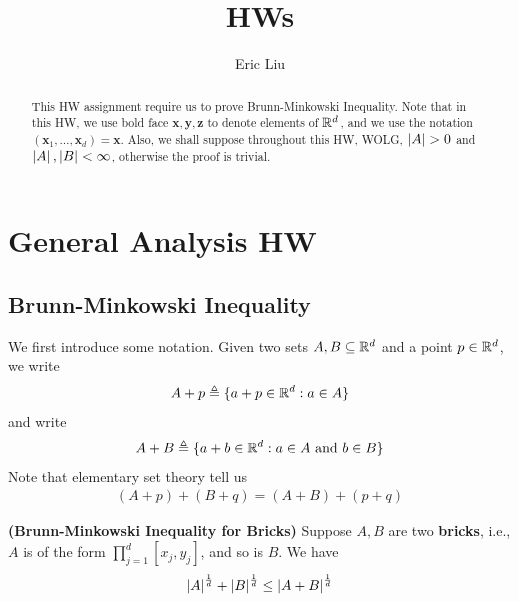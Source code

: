 \documentclass{report}
\title{\Huge{HWs}}
\author{\huge{Eric Liu}}
\date{}
\begin{document}
\maketitle
\newpage%
\tableofcontents
\pagebreak

\chapter{General Analysis HW}
\section{Brunn-Minkowski Inequality}
\begin{abstract}
This HW assignment require us to prove Brunn-Minkowski Inequality. Note that in this HW, we use bold face $\textbf{x},\textbf{y},\textbf{z}$ to denote elements of $\mathbb{R}^d$, and  we use the notation $(\textbf{x}_1,\dots ,\textbf{x}_d)=\textbf{x}$. Also, we shall suppose throughout this HW, WOLG, $\abso{A}>0$ and $\left|A\right|,\left|B\right|<\infty$, otherwise the proof is trivial. 
\end{abstract}
\begin{mdframed}
We first introduce some notation. Given two sets $A,B\subseteq \mathbb{R}^d$ and a point $p\in\mathbb{R}^d$, we write 
\begin{align*}
A+p\triangleq \{ a+p\in\mathbb{R}^d: a \in A \}
\end{align*}
and write 
\begin{align*}
A+B \triangleq \{ a+b \in\mathbb{R}^d: a\in A\text{ and }b \in  B \}
\end{align*}
Note that elementary set theory tell us 
\begin{align}
\label{trans}
  (A+p)+(B+q)=(A+B)+(p+q)
\end{align}

\end{mdframed}
\begin{theorem}
\label{Brunn-Minkowski Inequality for Bricks}
\textbf{(Brunn-Minkowski Inequality for Bricks)} Suppose $A,B$ are two  \textbf{bricks}, i.e., $A$ is of the form $\prod_{j=1}^d[x_j,y_j]$, and so is $B$. We have 
\begin{align*}
\left|A\right|^{\frac{1}{d}}+ \left|B\right|^{\frac{1}{d}}\leq \left|A+B\right|^{\frac{1}{d}}
\end{align*}
\end{theorem}
\end{document}

